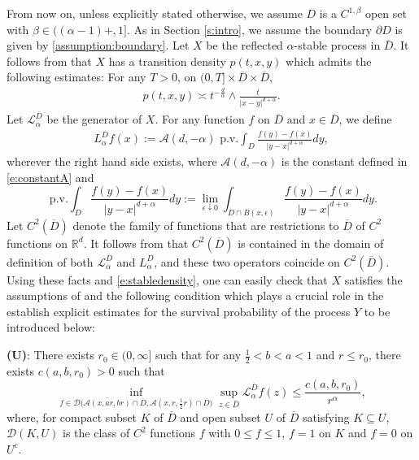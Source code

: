 \documentclass[12pt,a4paper]{amsart}
\numberwithin{equation}{section}
\theoremstyle{plain}
\newcommand{\al}{\alpha}
\newcommand{\mc}{\mathcal}
\newcommand{\R}{\mathbb{R}}
\newcommand{\1}{\mathbbm{1}}
\newcommand{\pw}[1]{{\color{red}[PW: #1]}}
\begin{document}
From now on, unless explicitly stated otherwise, we assume $D$ is a $C^{1,\beta}$ open set with $\beta\in ((\alpha-1)+, 1]$. 
As in Section \ref{s:intro}, we assume the boundary $\partial D$ is given by \eqref{assumption:boundary}. Let $X$ be the reflected $\alpha$-stable process in $\overline{D}$. It follows from \cite{CK03} that $X$ has a transition density $p(t, x, y)$
which admits the following estimates: For any $T>0$, on $(0, T]\times \overline{D}\times  \overline{D}$,
\begin{align}\label{e:stabledensity}
p(t,x,y) \asymp t^{-\frac{d}{\alpha}} \wedge 
\frac{t}{|x-y|^{d+\alpha}}.
\end{align}
Let $\mathcal{L}_{\alpha}^{\overline{D}}$ be the generator of $X$. 
For any function $f$ on $\overline{D}$ and $x\in \overline{D}$, 
we define
\begin{align}\label{e:pvgenerator}
L_\alpha^{D} f(x):=\mc{A}(d,-\alpha)\text{ p.v.}\int_{D}\frac{f(y)-f(x)}{|y-x|^{d+\alpha}}dy,
\end{align}
wherever the right hand side exists, where $\mc{A}(d,-\alpha)$ is the constant defined in \eqref{e:constantA} and
$$
\text{ p.v.}\int_{D}\frac{f(y)-f(x)}{|y-x|^{d+\alpha}}dy:=\lim_{\epsilon\downarrow 0}\int_{D\cap B(x, \epsilon)}\frac{f(y)-f(x)}{|y-x|^{d+\alpha}}dy.
$$
Let $C^2(\overline{D})$ denote the family of functions that are restrictions to $\overline{D}$ of $C^2$ functions on $\R^d$. 
It follows from \cite[Theorems 5.3 and 6.1]{Guan-Ma06} that $C^2(\overline{D})$ is contained in the domain of definition of
both $\mc{L}_\alpha^{\overline{D}}$ and $L_\alpha^{D}$, and these two operators coincide on $C^2(\overline{D})$.
Using these facts and \eqref{e:stabledensity}, one can easily check that $X$ satisfies the assumptions of \cite[Subsection 2.1]{CKSV20} and the following condition which plays a crucial role in the establish explicit estimates for the survival probability of the process $Y$ to be introduced below:

{\bf (U)}: There exists $r_0 \in (0, \infty]$ such that for any $\frac{1}{2}<b<a<1$ and $r \le  r_0$, there exists $c(a,b,r_0)>0$ such that
\begin{equation}\label{key upper bound}
\inf_{f \in \mc D\big(\overline{\mc A(x,ar, br)}\cap \overline{D}, \mc A(x,r,\frac{1}{2}r)\cap \overline{D} \big)} \sup_{z \in \overline{D}} \mc L_\alpha^{\overline{D}} f(z) \le \frac{c(a,b,r_0)}{r^\alpha},
\end{equation}
where,  for compact subset $K$ of $\overline{D}$ and open subset $U$ of $\overline{D}$ satisfying $K \subseteq U$,
$\mc D(K,U)$ is the class of $C^2$ functions $f$ with $0\le f \le 1$, $f = 1$ on $K$ and $f = 0$ on $U^c$.
\end{document}
